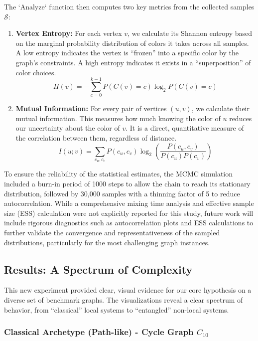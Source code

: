 \documentclass[12pt, letterpaper]{article}
\begin{document}
The `Analyze` function then computes two key metrics from the collected samples $\mathcal{S}$:
\begin{enumerate}
    \item \textbf{Vertex Entropy:} For each vertex $v$, we calculate its Shannon entropy based on the marginal probability distribution of colors it takes across all samples. A low entropy indicates the vertex is ``frozen'' into a specific color by the graph's constraints. A high entropy indicates it exists in a ``superposition'' of color choices.
    $$ H(v) = -\sum_{c=0}^{k-1} P(C(v)=c) \log_2 P(C(v)=c) $$
    \item \textbf{Mutual Information:} For every pair of vertices $(u, v)$, we calculate their mutual information. This measures how much knowing the color of $u$ reduces our uncertainty about the color of $v$. It is a direct, quantitative measure of the correlation between them, regardless of distance.
    $$ I(u; v) = \sum_{c_u, c_v} P(c_u, c_v) \log_2\left(\frac{P(c_u, c_v)}{P(c_u)P(c_v)}\right) $$
\end{enumerate}
To ensure the reliability of the statistical estimates, the MCMC simulation included a burn-in period of 1000 steps to allow the chain to reach its stationary distribution, followed by 30,000 samples with a thinning factor of 5 to reduce autocorrelation. While a comprehensive mixing time analysis and effective sample size (ESS) calculation were not explicitly reported for this study, future work will include rigorous diagnostics such as autocorrelation plots and ESS calculations to further validate the convergence and representativeness of the sampled distributions, particularly for the most challenging graph instances.

\subsection{Results: A Spectrum of Complexity}
This new experiment provided clear, visual evidence for our core hypothesis on a diverse set of benchmark graphs. The visualizations reveal a clear spectrum of behavior, from ``classical'' local systems to ``entangled'' non-local systems.

\subsubsection{Classical Archetype (Path-like) - Cycle Graph \texorpdfstring{$C_{10}$}{C10}}
\end{document}
